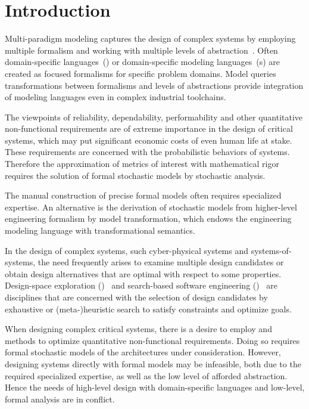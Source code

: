 \chapter{Introduction}
\label{chap:intro}

Multi-paradigm modeling captures the design of complex systems by employing multiple formalism and working with multiple levels of abstraction~\citep{Giese06multiparadigm}. Often domain-specific languages~() or domain-specific modeling languages~(s) are created as focused formalisms for specific problem domains. Model queries transformations between formalisms and levels of abstractions provide integration of modeling languages even in complex industrial toolchains.

The viewpoints of reliability, dependability, performability and other quantitative non-functional requirements are of extreme importance in the design of critical systems, which may put significant economic costs of even human life at stake. These requirements are concerned with the probabilistic behaviors of systems. Therefore the approximation of metrics of interest with mathematical rigor requires the solution of formal stochastic models by stochastic analysis.

The manual construction of precise formal models often requires specialized expertise. An alternative is the derivation of stochastic models from higher-level engineering formalism by model transformation, which endows the engineering modeling language with transformational semantics.

In the design of complex systems, such cyber-physical systems and systems-of-systems, the need frequently arises to examine multiple design candidates or obtain design alternatives that are optimal with respect to some properties. Design-space exploration ()~ and search-based software engineering ()~ are disciplines that are concerned with the selection of design candidates by exhaustive or (meta-)heuristic search to satisfy constraints and optimize goals.

When designing complex critical systems, there is a desire to employ  and  methods to optimize quantitative non-functional requirements. Doing so requires formal stochastic models of the architectures under consideration. However, designing systems directly with formal models may be infeasible, both due to the required specialized expertise, as well as the low level of afforded abstraction. Hence the needs of high-level design with domain-specific languages and low-level, formal analysis are in conflict.


